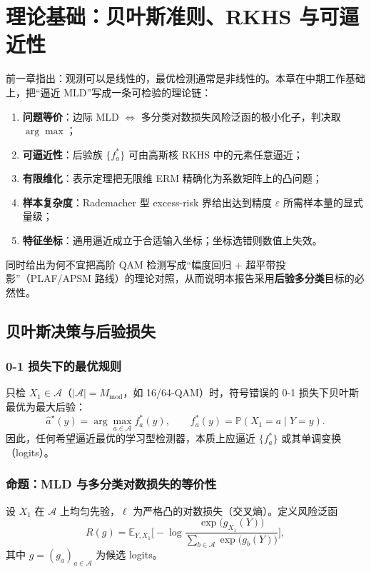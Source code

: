\chapter{理论基础：贝叶斯准则、RKHS 与可逼近性}
\label{ch:theory}

前一章指出：观测可以是线性的，最优检测通常是非线性的。本章在中期工作\cite{awan2018,steinwart2001,scholkopf2001,bartlett2002}基础上，把“逼近 MLD”写成一条可检验的理论链：
\begin{enumerate}[leftmargin=2em]
  \item \textbf{问题等价}：边际 MLD $\Leftrightarrow$ 多分类对数损失风险泛函的极小化子，判决取 $\arg\max$；
  \item \textbf{可逼近性}：后验族 $\{f_a^*\}$ 可由高斯核 RKHS 中的元素任意逼近；
  \item \textbf{有限维化}：表示定理把无限维 ERM 精确化为系数矩阵上的凸问题；
  \item \textbf{样本复杂度}：Rademacher 型 excess-risk 界给出达到精度 $\varepsilon$ 所需样本量的显式量级；
  \item \textbf{特征坐标}：通用逼近成立于合适输入坐标；坐标选错则数值上失效。
\end{enumerate}
同时给出为何不宜把高阶 QAM 检测写成“幅度回归 + 超平带投影”（PLAF/APSM 路线）的理论对照，从而说明本报告采用\textbf{后验多分类}目标的必然性。

\section{贝叶斯决策与后验损失}

\subsection{0-1 损失下的最优规则}
只检 $X_1\in\mathcal{A}$（$|\mathcal{A}|=M_{\mathrm{mod}}$，如 16/64-QAM）时，符号错误的 0-1 损失下贝叶斯最优为最大后验：
\begin{equation}
\hat a^{\star}(y)=\arg\max_{a\in\mathcal{A}} f_a^*(y),\qquad
f_a^*(y)=\mathbb{P}(X_1=a\mid Y=y).
\label{eq:map}
\end{equation}
因此，任何希望逼近最优的学习型检测器，本质上应逼近 $\{f_a^*\}$ 或其单调变换（logits）。

\subsection{命题：MLD 与多分类对数损失的等价性}
\label{sec:prop-mld-equiv}

设 $X_1$ 在 $\mathcal{A}$ 上均匀先验，$\ell$ 为严格凸的对数损失（交叉熵）。定义风险泛函
\begin{equation}
R(g)
=\mathbb{E}_{Y,X_1}\Big[
-\log\frac{\exp\big(g_{X_1}(Y)\big)}{\sum_{b\in\mathcal{A}}\exp\big(g_b(Y)\big)}
\Big],
\label{eq:risk-R}
\end{equation}
其中 $g=(g_a)_{a\in\mathcal{A}}$ 为候选 logits。

